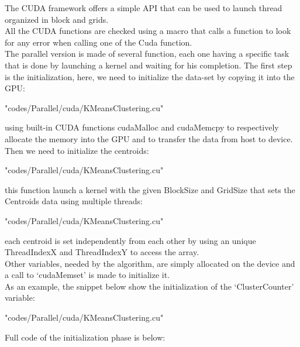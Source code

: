 \documentclass[10pt,twocolumn,letterpaper]{article}
\begin{document}
The CUDA framework offers a simple API that can be used to launch thread organized in block and grids.\\
All the CUDA functions are checked using a macro that calls a function to look for any error when calling one of the Cuda function.\\
The parallel version is made of several function, each one having a specific task that is done by launching a kernel and waiting for his
completion.\newpage
The first step is the initialization, here, we need to initialize the data-set by copying it into the GPU:\\
\begin{lstinputlisting}[language=C,style=CSnippetStyle,caption=CUDA Data-Set Initialization,firstline=244,lastline=254]{
	"codes/Parallel/cuda/KMeansClustering.cu"}
\end{lstinputlisting}
using built-in CUDA functions cudaMalloc and cudaMemcpy to respectively allocate the memory into the GPU and to transfer the data from
host to device.\\
Then we need to initialize the centroids:\\
\begin{lstinputlisting}[language=C,style=CSnippetStyle,caption=CUDA Centroids Initialization,firstline=186,lastline=203]{
	"codes/Parallel/cuda/KMeansClustering.cu"}
\end{lstinputlisting}
this function launch a kernel with the given BlockSize and GridSize that sets the Centroids data using multiple threads:\newpage
\begin{lstinputlisting}[language=C,style=CSnippetStyle,caption=CUDA Centroids Initialization,firstline=105,lastline=114]{
	"codes/Parallel/cuda/KMeansClustering.cu"}
\end{lstinputlisting}
each centroid is set independently from each other by using an unique ThreadIndexX and ThreadIndexY to access the array.\\
Other variables, needed by the algorithm, are simply allocated on the device and a call to `cudaMemset' is made to initialize it.\\
As an example, the snippet below show the initialization of the `ClusterCounter' variable:\\
\begin{lstinputlisting}[language=C,style=CSnippetStyle,caption=CUDA Example Initialization,firstline=207,lastline=219]{
	"codes/Parallel/cuda/KMeansClustering.cu"}
\end{lstinputlisting}
Full code of the initialization phase is below:\\
\end{document}
